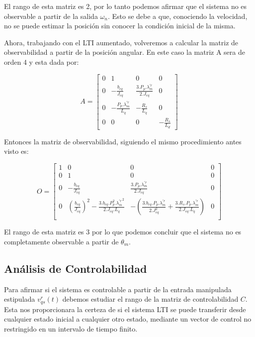 \documentclass{article}
\begin{document}
El rango de esta matriz es 2, por lo tanto podemos afirmar que el sistema no es observable a 
partir de la salida $\omega_n$. Esto se debe a que, conociendo la velocidad, no se puede estimar la 
posición sin conocer la condición inicial de la misma.

Ahora, trabajando con el LTI aumentado, volveremos a calcular la matriz de observabilidad a partir de la posición angular.
En este caso la matriz A sera de orden 4 y esta dada por:

\begin{equation}
    A = \begin{bmatrix}
        0 & 1 & 0 & 0 \\
        0 & -\frac{b_{eq}}{J_{eq}} & \frac{3.P_p.\lambda_m^{\prime r}}{2.J_{eq}} & 0 \\
        0 & -\frac{P_p.\lambda_m^{\prime r}}{L_q} & -\frac{R_s}{L_q} & 0 \\
        0 & 0 & 0 & -\frac{R_s}{L_d}
    \end{bmatrix}
\end{equation}

Entonces la matriz de observabilidad, siguiendo el mismo procedimiento antes visto es:

\begin{equation}
    O = \begin{bmatrix}
        1 & 0 & 0 & 0 \\
        0 & 1 & 0 & 0 \\
        0 & -\frac{b_{eq}}{J_{eq}} & \frac{3.P_p.\lambda_m^{\prime r}}{2.J_{eq}} & 0 \\ 
        0 & (\frac{b_{eq}}{J_{eq}})^2 - \frac{3.b_{eq}.P_p^2.{\lambda_m^{\prime r}}^2}{2.J_{eq}.L_q} & -(\frac{3.b_{eq}.P_p.{\lambda_m^{\prime r}}}{2.J_{eq}^2} + \frac{3.R_s.P_p.{\lambda_m^{\prime r}}}{2.J_{eq}.L_q}) & 0 \\ 
    \end{bmatrix}
\end{equation}

El rango de esta matriz es 3 por lo que podemos concluir que el sistema no es completamente observable a partir de $\theta_m$.


\subsection{Análisis de Controlabilidad}

Para afirmar si el sistema es controlable a partir de la entrada manipulada estipulada 
$v_{qs}^r(t)$ debemos estudiar el rango de la matriz de controlabilidad $C$. Esta nos 
proporcionara la certeza de si el sistema LTI se puede transferir desde cualquier estado inicial
a cualquier otro estado, mediante un vector de control no restringido en un intervalo de tiempo 
finito.
\end{document}
